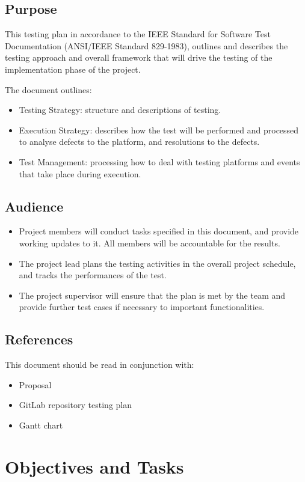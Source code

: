 \documentclass[12pt]{article}
\begin{document}
\subsection{Purpose}
This testing plan in accordance to the IEEE Standard for Software Test Documentation (ANSI/IEEE Standard 829-1983), outlines and describes the testing approach and overall framework that will drive the testing of the implementation phase of the project.

The document outlines:
\begin{itemize}
    \item Testing Strategy: structure and descriptions of testing.
    \item Execution Strategy: describes how the test will be performed and processed to analyse defects to the platform, and resolutions to the defects.
    \item Test Management: processing how to deal with testing platforms and events that take place during execution.
\end{itemize}

\subsection{Audience}
\begin{itemize}
    \item Project members will conduct tasks specified in this document, and provide working updates to it. All members will be accountable for the results.
    \item The project lead plans the testing activities in the overall project schedule, and tracks the performances of the test.
    \item The project supervisor will ensure that the plan is met by the team and provide further test cases if necessary to important functionalities.
\end{itemize}

\subsection{References}
This document should be read in conjunction with:
\begin{itemize}
    \item Proposal
    \item GitLab repository testing plan
    \item Gantt chart
\end{itemize}

\section{Objectives and Tasks}
\end{document}
